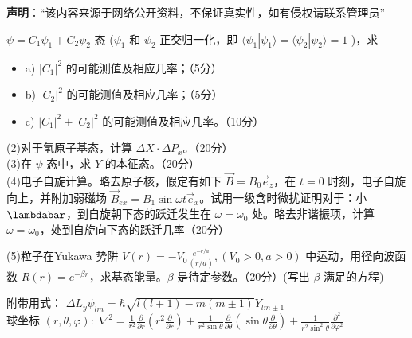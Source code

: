 
\textbf{声明}：“该内容来源于网络公开资料，不保证真实性，如有侵权请联系管理员”

\begin{enumerate}
     $\psi = C_1 \psi_1 + C_2 \psi_2$ 态 ($\psi_1$ 和 $\psi_2$ 正交归一化，即 $\langle \psi_1 | \psi_1 \rangle = \langle \psi_2 | \psi_2 \rangle = 1$ )，求
    \begin{itemize}
    \item a) $|C_1|^2$ 的可能测值及相应几率；（5分）
    \item b) $|C_2|^2$ 的可能测值及相应几率；（5分）
    \item c) $|C_1|^2 + |C_2|^2$ 的可能测值及相应几率。（10分）
   \end{itemize}
 
    (2)对于氢原子基态，计算 $\Delta X \cdot \Delta P_x$。（20分）\\
    (3)在 $\psi$ 态中，求 $Y$ 的本征态。（20分）\\
    (4)电子自旋计算。略去原子核，假定有如下 $\vec{B} = B_0 \vec{e}_z$，在 $t=0$ 时刻，电子自旋向上，并附加弱磁场 $\vec{B}_{ex} = B_1 \sin \omega t \vec{e}_x$。试用一级含时微扰证明对于：小 $\lambdabar$，到自旋朝下态的跃迁发生在 $\omega = \omega_0$ 处。略去非谐振项，计算 $\omega = \omega_0$，处到自旋向下态的跃迁几率（20分） 
     \end{enumerate}
     
    (5)粒子在Yukawa 势阱 $V(r) = -V_0 \frac{e^{-r/a}}{(r/a)}, \left( V_0 > 0, a > 0 \right)$
    中运动，用径向波函数 $R(r) = e^{-\beta r}$，求基态能量。$\beta$ 是待定参数。（20分）(写出 $\beta$ 满足的方程)
    
    附带用式：
$\Delta L_y \psi_{lm} = \hbar \sqrt{l(l+1)-m(m\pm 1)} Y_{lm \pm 1}$\\
$\text{球坐标 } (r, \theta, \varphi):$
$\nabla^2 = \frac{1}{r^2} \frac{\partial}{\partial r} \left( r^2 \frac{\partial}{\partial r} \right) + \frac{1}{r^2 \sin \theta} \frac{\partial}{\partial \theta} \left( \sin \theta \frac{\partial}{\partial \theta} \right) + \frac{1}{r^2 \sin^2 \theta} \frac{\partial^2}{\partial \varphi^2}$



